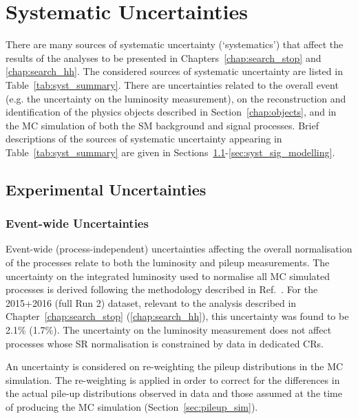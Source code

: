 \section{Systematic Uncertainties}
\label{sec:common_systematics}

There are many sources of systematic uncertainty (`systematics') that affect the results of the analyses
to be presented in Chapters~\ref{chap:search_stop} and \ref{chap:search_hh}.
The considered sources of systematic uncertainty are listed in Table~\ref{tab:syst_summary}.
There are uncertainties related to the overall event (e.g. the uncertainty
on the luminosity measurement), on the reconstruction and identification of
the physics objects described in Section~\ref{chap:objects}, and in the MC
simulation of both the SM background and signal processes.
Brief descriptions of the sources of systematic uncertainty
appearing in Table~\ref{tab:syst_summary} are given in Sections~\ref{sec:syst_experimental}-\ref{sec:syst_sig_modelling}.



%
%
\subsection{Experimental Uncertainties}
\label{sec:syst_experimental}

\subsubsection{Event-wide Uncertainties}
Event-wide (process-independent) uncertainties affecting the overall normalisation of the processes
relate to both the luminosity and pileup measurements.
The uncertainty on the integrated luminosity used to normalise all MC simulated
processes is derived following the methodology described in Ref.~\cite{LumiUncert}.
For the 2015+2016 (full Run 2) dataset, relevant to the analysis described in Chapter~\ref{chap:search_stop} (\ref{chap:search_hh}),
this uncertainty was found to be 2.1\% (1.7\%).
The uncertainty on the luminosity measurement does not affect processes whose
SR normalisation is constrained by data in dedicated CRs.

An uncertainty is considered on re-weighting the pileup distributions in the
MC simulation.
The re-weighting is applied in order to correct for the differences in the actual pile-up
distributions observed in data and those assumed at the time of producing the MC simulation (Section~\ref{sec:pileup_sim}).


